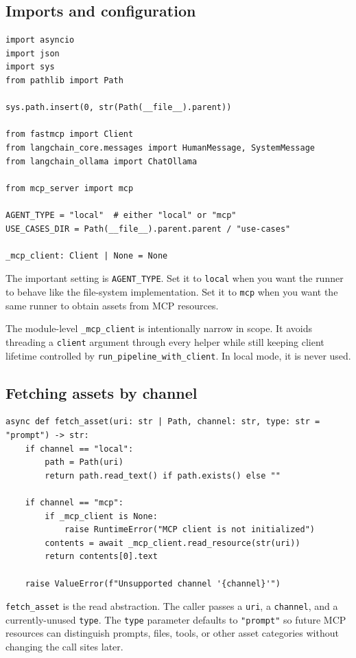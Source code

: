 \documentclass[12pt, a4paper]{article}
\begin{document}
\subsection{Imports and configuration}

\begin{lstlisting}[style=pythonstyle]
import asyncio
import json
import sys
from pathlib import Path

sys.path.insert(0, str(Path(__file__).parent))

from fastmcp import Client
from langchain_core.messages import HumanMessage, SystemMessage
from langchain_ollama import ChatOllama

from mcp_server import mcp

AGENT_TYPE = "local"  # either "local" or "mcp"
USE_CASES_DIR = Path(__file__).parent.parent / "use-cases"

_mcp_client: Client | None = None
\end{lstlisting}

The important setting is \texttt{AGENT\_TYPE}. Set it to \texttt{local} when you want the runner to behave like the file-system implementation. Set it to \texttt{mcp} when you want the same runner to obtain assets from MCP resources.

The module-level \texttt{\_mcp\_client} is intentionally narrow in scope. It avoids threading a \texttt{client} argument through every helper while still keeping client lifetime controlled by \texttt{run\_pipeline\_with\_client}. In local mode, it is never used.

\subsection{Fetching assets by channel}

\begin{lstlisting}[style=pythonstyle]
async def fetch_asset(uri: str | Path, channel: str, type: str = "prompt") -> str:
    if channel == "local":
        path = Path(uri)
        return path.read_text() if path.exists() else ""

    if channel == "mcp":
        if _mcp_client is None:
            raise RuntimeError("MCP client is not initialized")
        contents = await _mcp_client.read_resource(str(uri))
        return contents[0].text

    raise ValueError(f"Unsupported channel '{channel}'")
\end{lstlisting}

\texttt{fetch\_asset} is the read abstraction. The caller passes a \texttt{uri}, a \texttt{channel}, and a currently-unused \texttt{type}. The \texttt{type} parameter defaults to \texttt{"prompt"} so future MCP resources can distinguish prompts, files, tools, or other asset categories without changing the call sites later.
\end{document}
